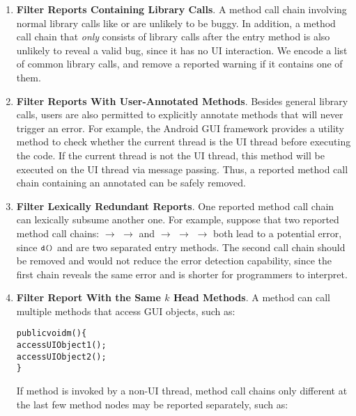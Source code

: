 \begin{enumerate}

\item \textbf{Filter Reports Containing Library Calls}. A
method call chain involving normal library calls
like  or  are unlikely to
be buggy. In addition, a method call chain that \textit{only}
consists of library calls after the entry method is also unlikely
to reveal a valid bug, since it has no UI interaction.
We encode a list of common library calls, and remove
a reported warning if it contains one of them.

\item \textbf{Filter Reports With User-Annotated Methods}. Besides general
library calls, users are also permitted
to explicitly annotate methods that will never trigger an error.
For example, the Android GUI framework provides a utility method 
 to check whether the current thread is the UI thread
before executing the code. If the current thread is not the UI thread,
this method will be executed on the UI thread via message passing.
Thus, a reported method call chain containing an annotated 
can be safely removed.

\item \textbf{Filter Lexically Redundant Reports}. One reported method call
chain can lexically subsume another one. For example, suppose that two
reported method call chains:  $\rightarrow$ 
$\rightarrow$  and 
 $\rightarrow$  $\rightarrow$  $\rightarrow$ 
both lead to a potential error, since $\CodeIn{d()}$ and 
are two separated entry methods. The second call chain should
be removed and would not reduce the error detection capability, since
the first chain reveals the same error and is shorter 
for programmers to interpret.


\item \textbf{Filter Report With the Same $k$ Head Methods}. A method can call
multiple methods that access GUI objects, such as:
\begin{CodeOut}
\begin{alltt}
     public void m() \{
         accessUIObject1();
         accessUIObject2();
     \}
\end{alltt}
\end{CodeOut}
If method  is invoked by a non-UI thread, method call chains
only different at the last few method nodes may be reported separately, such as:


\end{enumerate}
